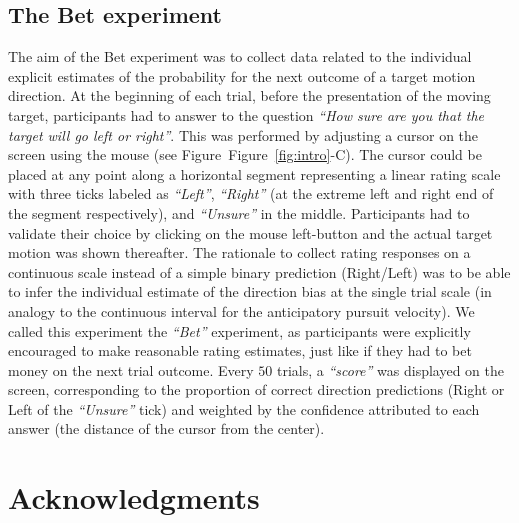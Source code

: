\documentclass[10pt,letterpaper]{article}
\newcommand{\seeFig}[1]{Figure~\ref{fig:#1}}
\begin{document}
\subsection{The Bet experiment}
The aim of the Bet experiment was to collect data related to the individual explicit estimates of the probability for the next outcome of a target motion direction. At the beginning of each trial, before the presentation of the moving target, participants had to answer to the question \textit{ ``How sure are you that the target will go left or right''}. This was performed by adjusting a cursor on the screen using the mouse (see Figure~\seeFig{intro}-C). The cursor could be placed at any point along a horizontal segment representing a linear rating scale with three ticks labeled as \textit{ ``Left''}, \textit{``Right''} (at the extreme left and right end of the segment respectively), and \textit{``Unsure''} in the middle. Participants had to validate their choice by clicking on the mouse left-button and the actual target motion was shown thereafter. The rationale to collect rating responses on a continuous scale instead of a simple binary prediction (Right/Left) was to be able to infer the individual estimate of the direction bias at the single trial scale (in analogy to the continuous interval for the anticipatory pursuit velocity). We called this experiment the \textit{ ``Bet''} experiment, as participants were explicitly encouraged to make reasonable rating estimates, just like if they had to bet money on the next trial outcome. Every $50$ trials, a \textit{``score''} was displayed on the screen, corresponding to the proportion of correct direction predictions (Right or Left of the \textit{``Unsure''} tick) and weighted by the confidence attributed to each answer (the distance of the cursor from the center).

\section*{Acknowledgments}
\Acknowledgments

\end{document}
